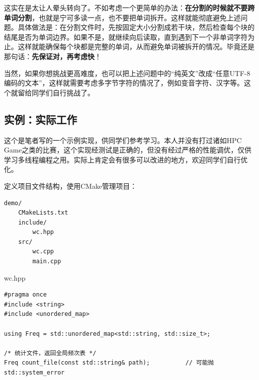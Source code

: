 这实在是太让人晕头转向了。不如考虑一个更简单的办法：\textbf{在分割的时候就不要跨单词分割}，也就是宁可多读一点，也不要把单词拆开。这样就能彻底避免上述问题。具体做法是：在分割文件时，先按固定大小分割成若干块，然后检查每个块的结尾是否为单词边界。如果不是，就继续向后读取，直到遇到下一个非单词字符为止。这样就能确保每个块都是完整的单词，从而避免单词被拆开的情况。毕竟还是那句话：\textbf{先保证对，再考虑快}！

当然，如果你想挑战更高难度，也可以把上述问题中的“纯英文”改成“任意UTF-8编码的文本”，这样就需要考虑多字节字符的情况了，例如变音字符、汉字等。这个就留给同学们自行挑战了。

\subsection{实例：实际工作}

\begin{note}
    这个是笔者写的一个示例实现，供同学们参考学习。本人并没有打过诸如HPC Game之类的比赛，这个实现经测试是正确的，但没有经过严格的性能调优，仅供学习多线程编程之用。实际上肯定会有很多可以改进的地方，欢迎同学们自行优化。
\end{note}

定义项目文件结构，使用CMake管理项目：
\begin{verbatim}
demo/
    CMakeLists.txt
    include/
        wc.hpp
    src/
        wc.cpp
        main.cpp
\end{verbatim}

wc.hpp
\begin{verbatim}
#pragma once
#include <string>
#include <unordered_map>

using Freq = std::unordered_map<std::string, std::size_t>;

/* 统计文件，返回全局频次表 */
Freq count_file(const std::string& path);          // 可能抛 std::system_error
\end{verbatim}

